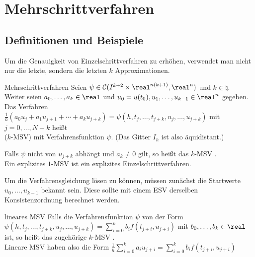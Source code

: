 \pagebreak

\section{%
    Mehrschrittverfahren%
}

\subsection{%
    Definitionen und Beispiele%
}

\begin{Bem}
    Um die Genauigkeit von Einzelschrittverfahren zu erhöhen, verwendet man
    nicht nur die letzte, sondern die letzten $k$ Approximationen.
\end{Bem}

\begin{Def}{Mehrschrittverfahren}
    Seien $\psi \in \C(I^{k+2} \times \real^{n(k+1)}, \real^n)$ und
    $k \in \natural$.\\
    Weiter seien $a_0, \dotsc, a_k \in \real$
    und $u_0 = u(t_0), u_1, \dotsc, u_{k-1} \in \real^n$ gegeben.
    Das Verfahren\\
    $\frac{1}{h} (a_0 u_j + a_1 u_{j+1} + \dotsb + a_k u_{j+k}) =
    \psi(h, t_j, \dotsc, t_{j+k}, u_j, \dotsc, u_{j+k})$ mit
    $j = 0, \dotsc, N - k$ heißt\\
     ($k$-MSV) mit Verfahrensfunktion $\psi$.
    (Das Gitter $I_h$ ist also äquidistant.)
\end{Def}

\begin{Bem}
    Falls $\psi$ nicht von $u_{j+k}$ abhängt und $a_k \not= 0$ gilt, so heißt
    das $k$-MSV .\\
    Ein explizites $1$-MSV ist ein explizites Einzelschrittverfahren.
\end{Bem}

\begin{Bem}
    Um die Verfahrensgleichung lösen zu können, müssen zunächst die Startwerte
    $u_0, \dotsc, u_{k-1}$ bekannt sein.
    Diese sollte mit einem ESV derselben Konsistenzordnung berechnet werden.
\end{Bem}

\begin{Def}{lineares MSV}
    Falls die Verfahrensfunktion $\psi$ von der Form
    $\psi(h, t_j, \dotsc, t_{j+k}, u_j, \dotsc, u_{j+k}) =
    \sum_{i=0}^k b_i f(t_{j+i}, u_{j+i})$ mit $b_0, \dotsc, b_k \in \real$ ist,
    so heißt das zugehörige $k$-MSV .\\
    Lineare MSV haben also die Form
    $\frac{1}{h} \sum_{i=0}^k a_i u_{j+i} =
    \sum_{i=0}^k b_i f(t_{j+i}, u_{j+i})$
\end{Def}

